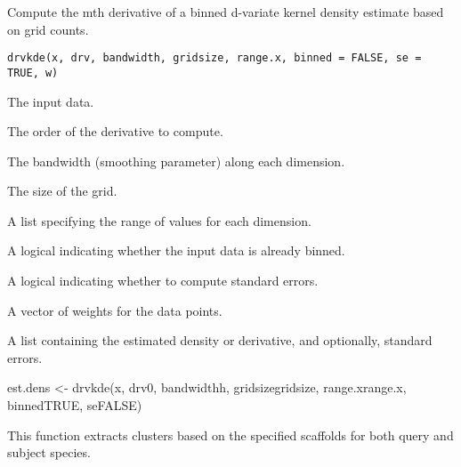 \documentclass[a4paper]{book}
\begin{document}
%
\begin{Description}\relax
Compute the mth derivative of a binned d-variate kernel density estimate based on grid counts.
\end{Description}
%
\begin{Usage}
\begin{verbatim}
drvkde(x, drv, bandwidth, gridsize, range.x, binned = FALSE, se = TRUE, w)
\end{verbatim}
\end{Usage}
%
\begin{Arguments}
\begin{ldescription}
\item[\code{x}] The input data.

\item[\code{drv}] The order of the derivative to compute.

\item[\code{bandwidth}] The bandwidth (smoothing parameter) along each dimension.

\item[\code{gridsize}] The size of the grid.

\item[\code{range.x}] A list specifying the range of values for each dimension.

\item[\code{binned}] A logical indicating whether the input data is already binned.

\item[\code{se}] A logical indicating whether to compute standard errors.

\item[\code{w}] A vector of weights for the data points.
\end{ldescription}
\end{Arguments}
%
\begin{Value}
A list containing the estimated density or derivative, and optionally, standard errors.
\end{Value}
%
\begin{Examples}
\begin{ExampleCode}
est.dens <- drvkde(x, drv0, bandwidthh, gridsizegridsize, range.xrange.x, binnedTRUE, seFALSE)
\end{ExampleCode}
\end{Examples}
%
\begin{Description}\relax
This function extracts clusters based on the specified scaffolds for both query and subject species.
\end{Description}
\end{document}
